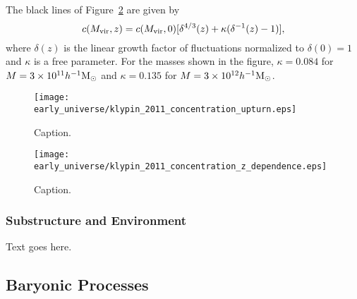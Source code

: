 The black lines of Figure~\ref{fig:concentration--klypin_concentration_z_dependence} are given by
\begin{equation}
	c({M_{\mathrm{vir}}}, z) = c({M_{\mathrm{vir}}}, 0) [\delta^{4/3}(z) + \kappa(\delta^{-1}(z) - 1)],
\end{equation}
where $\delta(z)$ is the linear growth factor of fluctuations normalized to $\delta(0) = 1$ and $\kappa$ is a free parameter.  For the masses shown in the figure, $\kappa = 0.084$ for $M = 3 \times 10^{11} h^{-1} {\rm M_\odot}$ and $\kappa = 0.135$ for $M = 3 \times 10^{12} h^{-1} {\rm M_\odot}$.

\begin{figure}[ht]
	\centering
	\texttt{[image: early\_universe/klypin\_2011\_concentration\_upturn.eps]}
	\caption[Caption]{\footnotesize Caption.}
	\label{fig:concentration--klypin_concentration_upturn}
\end{figure}

\begin{figure}[ht]
	\centering
	\texttt{[image: early\_universe/klypin\_2011\_concentration\_z\_dependence.eps]}
	\caption[Caption]{\footnotesize Caption.}
	\label{fig:concentration--klypin_concentration_z_dependence}
\end{figure}



\subsubsection{Substructure and Environment}
\label{subsubsec:early_universe--halo_properties--structure}


Text goes here.




\subsection{Baryonic Processes}
\label{subsec:early_universe--baryonic_processes}


